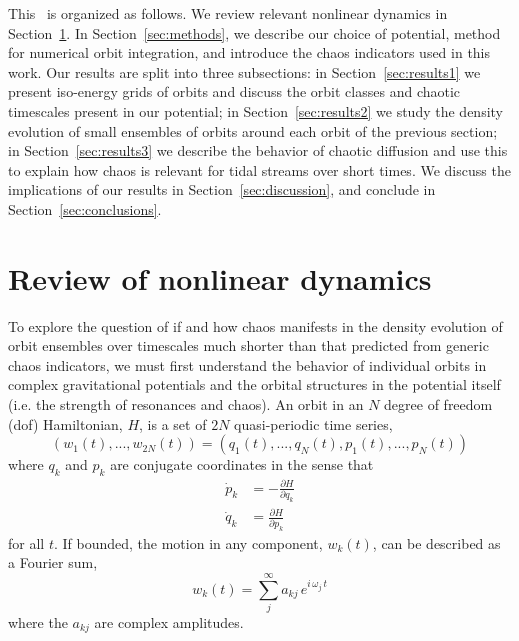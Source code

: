 This \article\ is organized as follows. We review relevant nonlinear dynamics in
Section~\ref{sec:nldreview}. In Section~\ref{sec:methods}, we describe our
choice of potential, method for numerical orbit integration, and introduce the
chaos indicators used in this work. Our results are split into three
subsections: in Section~\ref{sec:results1} we present iso-energy grids of orbits
and discuss the orbit classes and chaotic timescales present in our potential;
in Section~\ref{sec:results2} we study the density evolution of small ensembles
of orbits around each orbit of the previous section; in
Section~\ref{sec:results3} we describe the behavior of chaotic diffusion and use
this to explain how chaos is relevant for tidal streams over short times. We
discuss the implications of our results in Section~\ref{sec:discussion}, and
conclude in Section~\ref{sec:conclusions}.

\section{Review of nonlinear dynamics}\label{sec:nldreview}

To explore the question of if and how chaos manifests in the density evolution
of orbit ensembles over timescales much shorter than that predicted from generic
chaos indicators, we must first understand the behavior of individual orbits in
complex gravitational potentials and the orbital structures in the potential
itself (i.e. the strength of resonances and chaos). An orbit in an $N$ degree of
freedom (dof) Hamiltonian, $H$, is a set of $2N$ quasi-periodic time series,
\begin{equation}
(w_1(t),...,w_{2N}(t)) = (q_1(t),...,q_{N}(t),p_1(t),...,p_{N}(t)) \label{eq:coords}
\end{equation}
where $q_k$ and $p_k$ are conjugate coordinates in the sense that
\begin{align}
	\dot{p}_k &= -\frac{\partial H}{\partial q_k}\\
	\dot{q}_k &= \frac{\partial H}{\partial p_k}
\end{align}
for all $t$. If bounded, the motion in any component, $w_k(t)$, can be described as a Fourier sum,
\begin{equation}
	w_k(t) = \sum_j^\infty a_{kj} \, e^{i\,\omega_j\,t} \label{eq:fourier}
\end{equation}
where the $a_{kj}$ are complex amplitudes.

